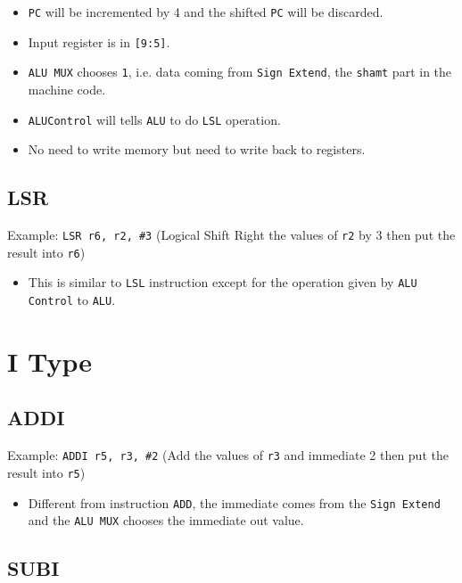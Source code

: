 \documentclass[11pt,fancy,bibstyle=ieee]{elegantbook}
\begin{document}
      \begin{itemize}
        \item \texttt{PC} will be incremented by 4 and the shifted \texttt{PC} will be discarded.
        \item Input register is in \texttt{[9:5]}.
        \item \texttt{ALU MUX} chooses \texttt{1}, i.e. data coming from \texttt{Sign Extend}, the \texttt{shamt} part in the machine code.
        \item \texttt{ALUControl} will tells \texttt{ALU} to do \texttt{LSL} operation.
        \item No need to write memory but need to write back to registers.
      \end{itemize}
      
    \subsection{LSR}

      Example: \texttt{LSR r6, r2, \#3} (Logical Shift Right the values of \texttt{r2} by 3 then put the result into \texttt{r6})

      \begin{itemize}
        \item This is similar to \texttt{LSL} instruction except for the operation given by \texttt{ALU Control} to \texttt{ALU}.
      \end{itemize}

  \section{I Type}

    \subsection{ADDI}

      Example: \texttt{ADDI r5, r3, \#2} (Add the values of \texttt{r3} and immediate 2 then put the result into \texttt{r5})

      \begin{itemize}
        \item Different from instruction \texttt{ADD}, the immediate comes from the \texttt{Sign Extend} and the \texttt{ALU MUX} chooses the immediate out value.
      \end{itemize}
      

    \subsection{SUBI}
\end{document}

